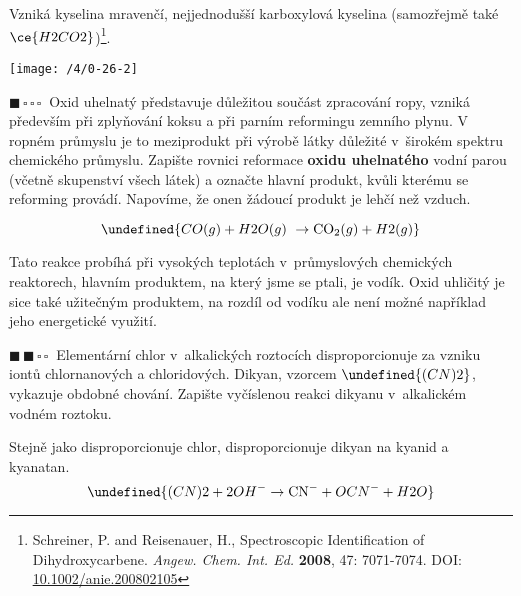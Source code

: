 \documentclass{book}
\let\ch\undefined
\newcommand{\jeden}{$\blacksquare \, \square \, \square \, \square \; \; $}
\newcommand{\dva}{$\blacksquare \, \blacksquare \, \square \, \square \; \; $}
\renewenvironment{quotation}{\par}{\par} %
\begin{document}
Vzniká kyselina mravenčí, nejjednodušší karboxylová kyselina (samozřejmě
také $\ce{H2CO2}$)\footnote{Schreiner, P. and Reisenauer, H., Spectroscopic Identification
of Dihydroxycarbene. \textit{Angew. Chem. Int. Ed.} \textbf{2008}, 47:
7071-7074. DOI:
\href{https://doi.org/10.1002/anie.200802105}{\underline{10.1002/anie.200802105}}}.
\noindent \begin{center}

\texttt{[image: /4/0-26-2]}

\par\end{center}

\hrulefill %
\begin{quotation}
\jeden Oxid uhelnatý představuje důležitou součást zpracování ropy, vzniká
především při zplyňování koksu a při parním reformingu zemního plynu.
V ropném průmyslu je to meziprodukt při výrobě látky důležité v~širokém
spektru chemického průmyslu. Zapište rovnici reformace \textbf{oxidu uhelnatého}
vodní parou (včetně skupenství všech látek) a označte hlavní produkt,
kvůli kterému se reforming provádí. Napovíme, že onen žádoucí produkt
je lehčí než vzduch.
\end{quotation} \dotfill \par 
\[
\ch{CO (g) + H2O (g)\  \rightarrow \mathrm{CO_2 } (g) + H2 (g)}
\]

Tato reakce probíhá při vysokých teplotách v~průmyslových chemických
reaktorech, hlavním produktem, na který jsme se ptali, je vodík. Oxid
uhličitý je sice také užitečným produktem, na rozdíl od vodíku ale není možné například jeho energetické využití.

\hrulefill %
\begin{quotation}
\dva Elementární chlor v~alkalických roztocích disproporcionuje za vzniku
iontů chlornanových a chloridových. Dikyan, vzorcem $\ch{(CN)2}$,
vykazuje obdobné chování. Zapište vyčíslenou reakci dikyanu v~alkalickém
vodném roztoku.
\end{quotation} \dotfill \par 
Stejně jako disproporcionuje chlor, disproporcionuje dikyan na kyanid
a kyanatan. 
\[
\ch{(CN)2 + 2 OH^{-}\rightarrow \mathrm{CN^{-}} + OCN^{-} + H2O}
\]
\end{document}
